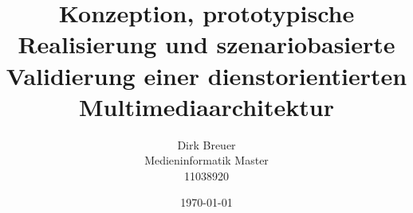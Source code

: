 \documentclass[12pt,headsepline,DIV12,BCOR12mm,a4paper,oneside,cleardoublestandard,openany,bibtotoc,liststotoc,halfparskip]{scrbook}
\begin{document}
\titlehead{
	{\large Fachhochschule Köln --- Campus Gummersbach\\
		\hfill }
	Steinmüllerallee~1\\
	51643 Gummersbach
	}
	\title{Konzeption, prototypische Realisierung und szenariobasierte Validierung einer dienstorientierten Multimediaarchitektur}
	\author{Dirk Breuer\\Medieninformatik Master\\11038920}
	\publishers{
		\center
		\vspace{0.5cm}
		\large University of Applied Science of Cologne\\\textbf{Erstprüfer:} Prof. Dr. Mario Winter\\
		\large University of Applied Science of Cologne\\\textbf{Zweitprüfer:} Prof. Dr. Kristian Fischer\\
		\vspace{0.5cm}
    \large \href{mailto:dirk.breuer@gmail.com}{\emph{dirk.breuer@gmail.com}}
		}
	\date{\today}


\frontmatter

\newpage

\newpage


\mainmatter








\appendix

% 



% 

\end{document}
